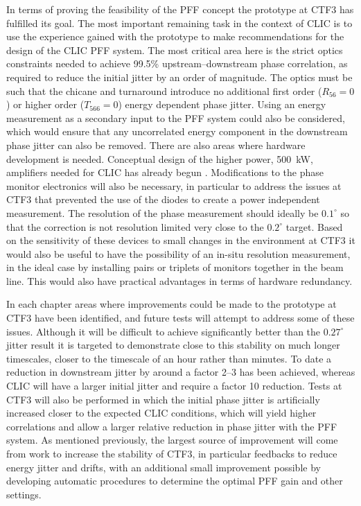 
In terms of proving the feasibility of the PFF concept the prototype at CTF3 has fulfilled its goal.  The most important remaining task in the context of CLIC is to use the experience gained with the prototype to make recommendations for the design of the CLIC PFF system. The most critical area here is the strict optics constraints needed to achieve 99.5\% upstream--downstream phase correlation, as required to reduce the initial jitter by an order of magnitude. The optics must be such that the chicane and turnaround introduce no additional first order (\(R_{56} = 0\)) or higher order (\(T_{566} = 0\)) energy dependent phase jitter. Using an energy measurement as a secondary input to the PFF system could also be considered, which would ensure that any uncorrelated energy component in the downstream phase jitter can also be removed. There are also areas where hardware development is needed. Conceptual design of the higher power, 500~kW, amplifiers needed for CLIC has already begun \cite{colinCLIC16}. Modifications to the phase monitor electronics will also be necessary, in particular to address the issues at CTF3 that prevented the use of the diodes to create a power independent measurement. The resolution of the phase measurement should ideally be \(0.1^\circ\) so that the correction is not resolution limited very close to the \(0.2^\circ\) target. Based on the sensitivity of these devices to small changes in the environment at CTF3 it would also be useful to have the possibility of an in-situ resolution measurement, in the ideal case by installing pairs or triplets of monitors together in the beam line. This would also have practical advantages in terms of hardware redundancy.

In each chapter areas where improvements could be made to the prototype at CTF3 have been identified, and future tests will attempt to address some of these issues. Although it will be difficult to achieve significantly better than the \(0.27^\circ\) jitter result it is targeted to demonstrate close to this stability on much longer timescales, closer to the timescale of an hour rather than minutes. To date a reduction in downstream jitter by around a factor 2--3 has been achieved, whereas CLIC will have a larger initial jitter and require a factor 10 reduction. Tests at CTF3 will also be performed in which the initial phase jitter is artificially increased closer to the expected CLIC conditions, which will yield higher correlations and allow a larger relative reduction in phase jitter with the PFF system. As mentioned previously, the largest source of improvement will come from work to increase the stability of CTF3, in particular feedbacks to reduce energy jitter and drifts, with an additional small improvement possible by developing automatic procedures to determine the optimal PFF gain and other settings.

